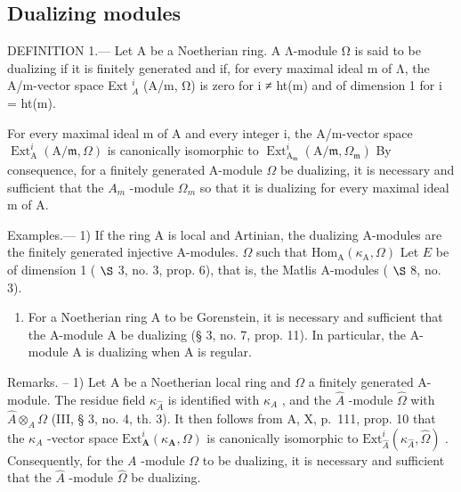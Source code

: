 \subsection{Dualizing modules}

DEFINITION 1.--- Let A be a Noetherian ring. A Λ-module Ω is said to be dualizing if it is finitely generated and if, for every maximal ideal m of Λ, the A/m-vector space Ext \(_{A}^{i}\) (A/m, Ω) is zero for i ≠ ht(m) and of dimension 1 for i = ht(m).

For every maximal ideal m of A and every integer i, the A/m-vector space \(\operatorname{Ext}_{\mathrm{A}}^{i}(\mathrm{A}/\mathfrak{m},\Omega)\) is canonically isomorphic to \(\operatorname{Ext}_{\mathrm{A}_{\mathfrak{m}}}^{i}(\mathrm{A}/\mathfrak{m},\Omega_{\mathfrak{m}})\) By consequence, for a finitely generated A-module \(\Omega\) be dualizing, it is necessary and sufficient that the \(A_{m}\) -module \(\Omega_{m}\) so that it is dualizing for every maximal ideal m of A.

Examples.--- 1) If the ring A is local and Artinian, the dualizing A-modules are the finitely generated injective A-modules. \(\Omega\) such that \(\mathrm{Hom}_{\mathrm{A}}(\kappa_{\mathrm{A}},\Omega)\) Let \( E \) be of dimension 1 ( \(\S\) 3, no. 3, prop. 6), that is, the Matlis A-modules ( \(\S\) 8, no. 3).

\begin{enumerate}
\def\labelenumi{\arabic{enumi})}
\setcounter{enumi}{1}
\tightlist
\item
  For a Noetherian ring A to be Gorenstein, it is necessary and sufficient that the A-module A be dualizing (§ 3, no. 7, prop. 11). In particular, the A-module A is dualizing when A is regular.
\end{enumerate}

Remarks. -- 1) Let A be a Noetherian local ring and \(\Omega\) a finitely generated A-module. The residue field \(\kappa_{\widehat{A}}\) is identified with \(\kappa_{A}\) , and the \(\widehat{A}\) -module \(\widehat{\Omega}\) with \(\widehat{A} \otimes_{A} \Omega\) (III, § 3, no. 4, th. 3). It then follows from A, X, p.~111, prop. 10 that the \(\kappa_{A}\) -vector space \(\mathrm{Ext}_{\mathbf{A}}^{i}(\kappa_{\mathbf{A}}, \Omega)\) is canonically isomorphic to \(\mathrm{Ext}_{\widehat{A}}^{i}(\kappa_{\widehat{A}}, \widehat{\Omega})\) . Consequently, for the \(A\) -module \(\Omega\) to be dualizing, it is necessary and sufficient that the \(\widehat{A}\) -module \(\widehat{\Omega}\) be dualizing.

